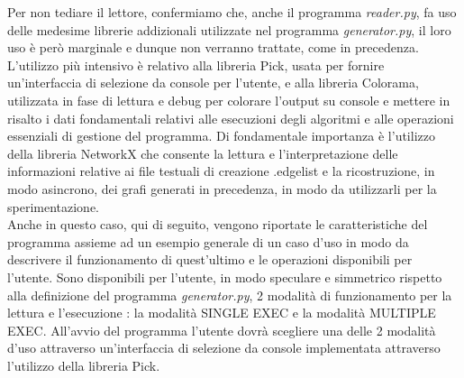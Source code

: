 Per non tediare il lettore, confermiamo che, anche il programma \textit{reader.py}, fa uso delle medesime librerie addizionali utilizzate nel programma \textit{generator.py}, il loro uso è però marginale e dunque non verranno trattate, come in precedenza. L'utilizzo più intensivo è relativo alla libreria Pick, usata per fornire un'interfaccia di selezione da console per l'utente, e alla libreria Colorama, utilizzata in fase di lettura e debug per colorare l'output su console e mettere in risalto i dati fondamentali relativi alle esecuzioni degli algoritmi e alle operazioni essenziali di gestione del programma. Di fondamentale importanza è l'utilizzo della libreria NetworkX che consente la lettura e l'interpretazione delle informazioni relative ai file testuali di creazione .edgelist e la ricostruzione, in modo asincrono, dei grafi generati in precedenza, in modo da utilizzarli per la sperimentazione.\\
Anche in questo caso, qui di seguito, vengono riportate le caratteristiche del programma assieme ad un esempio generale di un caso d'uso in modo da descrivere il funzionamento di quest'ultimo e le operazioni disponibili per l'utente. Sono disponibili per l'utente, in modo speculare e simmetrico rispetto alla definizione del programma \textit{generator.py}, 2 modalità di funzionamento per la lettura e l'esecuzione : la modalità SINGLE EXEC e la modalità MULTIPLE EXEC. All'avvio del programma l'utente dovrà scegliere una delle 2 modalità d'uso attraverso un'interfaccia di selezione da console implementata attraverso l'utilizzo della libreria Pick.\\

